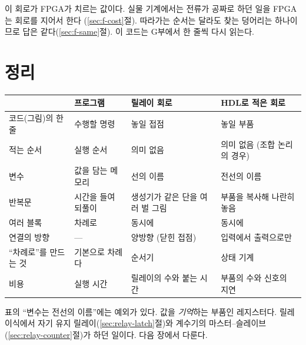 이 회로가 FPGA가 치르는 값이다. 실물 기계에서는 전류가 공짜로 하던 일을 FPGA는 회로를 지어서 한다
(\ref{sec:f-cost}절). 따라가는 순서는 달라도 찾는 덩어리는 하나이므로 답은 같다(\ref{sec:f-same}절). 이 코드는
G부에서 한 줄씩 다시 읽는다.

\section{정리}

\begin{center}
\small
\begin{tabularx}{\linewidth}{l >{\raggedright\arraybackslash}X >{\raggedright\arraybackslash}X >{\raggedright\arraybackslash}X}
\toprule
 & 프로그램 & 릴레이 회로 & HDL로 적은 회로 \\
\midrule
코드(그림)의 한 줄 & 수행할 명령 & 놓일 접점 & 놓일 부품 \\
적는 순서 & 실행 순서 & 의미 없음 & 의미 없음 (조합 논리의 경우) \\
변수 & 값을 담는 메모리 & 선의 이름 & 전선의 이름 \\
반복문 & 시간을 들여 되풀이 & 생성기가 같은 단을 여러 벌 그림 & 부품을 복사해 나란히 놓음 \\
여러 블록 & 차례로 & 동시에 & 동시에 \\
연결의 방향 & --- & 양방향 (닫힌 접점) & 입력에서 출력으로만 \\
``차례로''를 만드는 것 & 기본으로 차례다 & 순서기 & 상태 기계 \\
비용 & 실행 시간 & 릴레이의 수와 붙는 시간 & 부품의 수와 신호의 지연 \\
\bottomrule
\end{tabularx}
\end{center}

표의 ``변수는 전선의 이름''에는 예외가 있다. 값을 \emph{기억}하는 부품인 레지스터다. 릴레이식에서 자기 유지
릴레이(\ref{sec:relay-latch}절)와 계수기의 마스터--슬레이브(\ref{sec:relay-counter}절)가 하던 일이다. 다음 장에서
다룬다.

